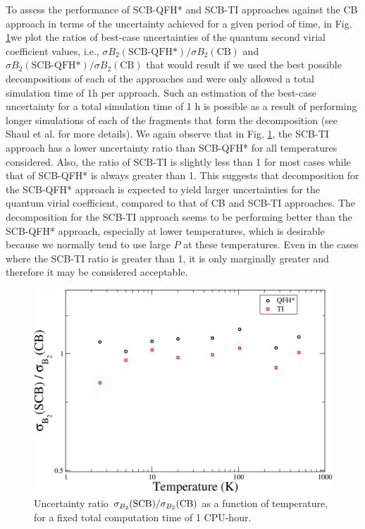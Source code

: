     To assess the performance of SCB-QFH* and SCB-TI approaches against the CB approach in terms of the uncertainty achieved for a given period of time, in Fig. \ref{uncB21Hr}we plot the ratios of best-case uncertainties of the quantum second virial coefficient values, i.e., $\sigma B_2 (\text{SCB-QFH*})/\sigma B_2 (\text{CB})$ and $\sigma B_2 (\text{SCB-QFH*} )/\sigma B_2 (\text{CB})$ that would result if we used the best possible decompositions of each of the approaches and were only allowed a total simulation time of 1h per approach. Such an estimation of the best-case uncertainty for a total simulation time of 1 h is possible as a result of performing longer simulations of each of the fragments that form the decomposition (see Shaul et al. \cite{Shaul2012} for more details). We again observe that in Fig. \ref{uncB21Hr}, the SCB-TI approach has a lower uncertainty ratio than SCB-QFH* for all temperatures considered. Also, the ratio of SCB-TI is slightly less than 1 for most cases while that of SCB-QFH* is always greater than 1. This suggests that decomposition for the SCB-QFH* approach is expected to yield larger uncertainties for the quantum virial coefficient, compared to that of CB and SCB-TI approaches. The decomposition for the SCB-TI approach seems to be performing better than the SCB-QFH* approach, especially at lower temperatures, which is desirable because we normally tend to use large $P$ at these temperatures. Even in the cases where the SCB-TI ratio is greater than 1, it is only marginally greater and therefore it may be considered acceptable.
    \begin{figure}
        \centering
        \includegraphics[scale=0.3,keepaspectratio]{Chapter-3/Figures/uncB21Hr.png}
        \caption{Uncertainty ratio $\protect \sigma_{B_2}{\rm(SCB)}/\sigma_{B_2}{\rm{(CB)}}$ as a function of temperature, for a fixed total computation time of 1 CPU-hour.} \label{uncB21Hr}
    \end{figure}

